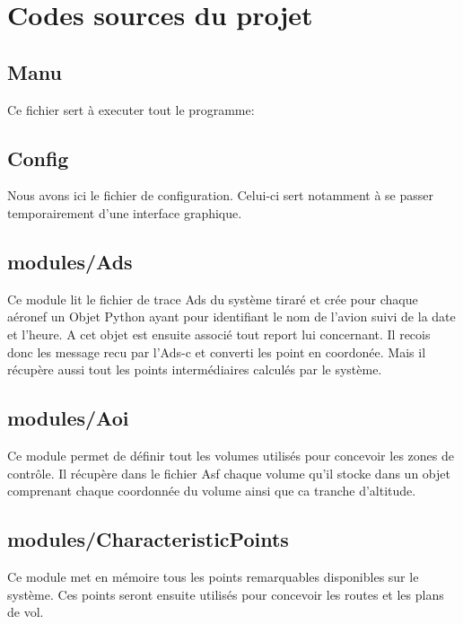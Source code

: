 \section{Codes sources du projet}
    \subsection{Manu\label{pyManu}}
Ce fichier sert à executer tout le programme:
\newpage

    \subsection{Config\label{pyConfig}}
Nous avons ici le fichier de configuration. Celui-ci sert notamment à se passer temporairement d'une interface graphique.
\newpage

    \subsection{modules/Ads\label{pyAds}} 
Ce module lit le fichier de trace Ads du système tiraré et crée pour chaque aéronef un Objet Python ayant pour identifiant le nom de l'avion suivi de la date et l'heure. A cet objet est ensuite associé tout report lui concernant. Il recois donc les message recu par l'Ads-c et converti les point en coordonée. Mais il récupère aussi tout les points intermédiaires calculés par le système.
\newpage


    \subsection{modules/Aoi\label{pyAoi}} 
Ce module permet de définir tout les volumes utilisés pour concevoir les zones de contrôle. Il récupère dans le fichier Asf chaque volume qu'il stocke dans un objet comprenant chaque coordonnée du volume ainsi que ca tranche d'altitude.
\newpage

    \subsection{modules/CharacteristicPoints\label{pyCP}}
Ce module met en mémoire tous les points remarquables disponibles sur le système. Ces points seront ensuite utilisés pour concevoir les routes et les plans de vol.
\newpage

